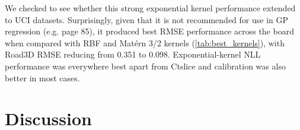 \begin{remark}
    We checked to see whether this strong exponential kernel performance extended to UCI datasets. Surprisingly, given that it is not recommended for use in GP regression (e.g. \cite{GP_book} page 85),  it produced best RMSE performance across the board when compared with RBF and Matérn 3/2 kernels (\autoref{tab:best_kernels}), with Road3D RMSE reducing from 0.351 to 0.098. Exponential-kernel NLL performance was everywhere best apart from Ctslice and calibration was also better in most cases.
\end{remark}


\section{Discussion}

